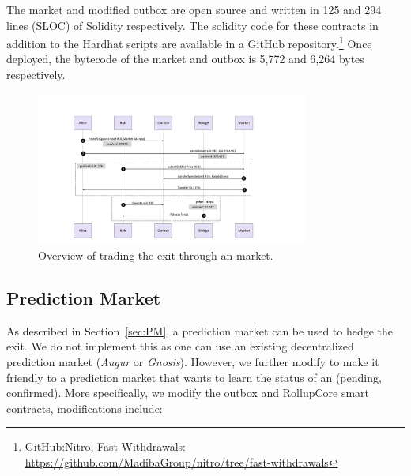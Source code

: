 The market and modified outbox are open source and written in 125 and 294 lines (SLOC) of Solidity respectively. The solidity code for these contracts in addition to the Hardhat scripts are available in a GitHub repository.\footnote{GitHub:Nitro, Fast-Withdrawals: \url{https://github.com/MadibaGroup/nitro/tree/fast-withdrawals}} Once deployed, the bytecode of the market and outbox is 5,772 and 6,264 bytes respectively.

\begin{figure}[t]
	\includegraphics[width=0.8\textwidth]{figures/marketflow.pdf}
	\caption{Overview of trading the exit through an \layerone market.}
	\centering
	\label{fig:marketflow}
\end{figure}

\subsection{Prediction Market }
As described in Section~\ref{sec:PM}, a prediction market can be used to hedge the exit. We do not implement this as one can use an existing decentralized prediction market (\eg \textit{Augur} or \textit{Gnosis}). However, we further modify \arb \nitro to make it friendly to a prediction market that wants to learn the status of an \rblock (pending, confirmed). More specifically, we modify the \arb \nitro outbox and RollupCore smart contracts, modifications include:


